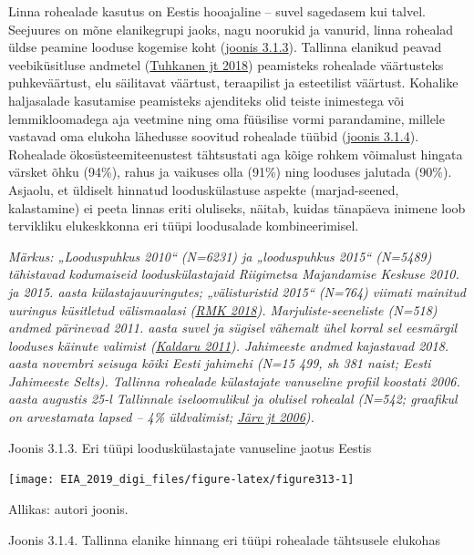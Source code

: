 \documentclass[estonian,]{article}
\begin{document}
Linna rohealade kasutus on Eestis hooajaline -- suvel sagedasem kui talvel. Seejuures on mõne elanikegrupi jaoks, nagu noorukid ja vanurid, linna rohealad üldse peamine looduse kogemise koht (\protect\hyperlink{figure313}{joonis 3.1.3}). Tallinna elanikud peavad veebiküsitluse andmetel (\protect\hyperlink{Tuhkanen2018}{Tuhkanen jt 2018}) peamisteks rohealade väärtusteks puhkeväärtust, elu säilitavat väärtust, teraapilist ja esteetilist väärtust. Kohalike haljasalade kasutamise peamisteks ajenditeks olid teiste inimestega või lemmikloomadega aja veetmine ning oma füüsilise vormi parandamine, millele vastavad oma elukoha lähedusse soovitud rohealade tüübid (\protect\hyperlink{figure314}{joonis 3.1.4}). Rohealade ökosüsteemiteenustest tähtsustati aga kõige rohkem võimalust hingata värsket õhku (94\%), rahus ja vaikuses olla (91\%) ning looduses jalutada (90\%). Asjaolu, et üldiselt hinnatud looduskülastuse aspekte (marjad-seened, kalastamine) ei peeta linnas eriti oluliseks, näitab, kuidas tänapäeva inimene loob tervikliku elukeskkonna eri tüüpi loodusalade kombineerimisel.

\emph{Märkus: „Looduspuhkus 2010`` (N=6231) ja „looduspuhkus 2015`` (N=5489) tähistavad kodumaiseid looduskülastajaid Riigimetsa Majandamise Keskuse 2010. ja 2015. aasta külastajauuringutes; „välisturistid 2015`` (N=764) viimati mainitud uuringus küsitletud välismaalasi (\protect\hyperlink{RMK2018}{RMK 2018}). Marjuliste-seeneliste (N=518) andmed pärinevad 2011. aasta suvel ja sügisel vähemalt ühel korral sel eesmärgil looduses käinute valimist (\protect\hyperlink{Kaldaru2011}{Kaldaru 2011}). Jahimeeste andmed kajastavad 2018. aasta novembri seisuga kõiki Eesti jahimehi (N=15 499, sh 381 naist; Eesti Jahimeeste Selts). Tallinna rohealade külastajate vanuseline profiil koostati 2006. aasta augustis 25-l Tallinnale iseloomulikul ja olulisel rohealal (N=542; graafikul on arvestamata lapsed -- 4\% üldvalimist; \protect\hyperlink{Juxe4rv2006}{Järv jt 2006}).}

{Joonis 3.1.3.} Eri tüüpi looduskülastajate vanuseline jaotus Eestis

\begin{center}\texttt{[image: EIA\_2019\_digi\_files/figure-latex/figure313-1]} \end{center}

\begin{imgsource}
{Allikas:} autori joonis.
\end{imgsource}

{Joonis 3.1.4.} Tallinna elanike hinnang eri tüüpi rohealade tähtsusele elukohas
\end{document}
